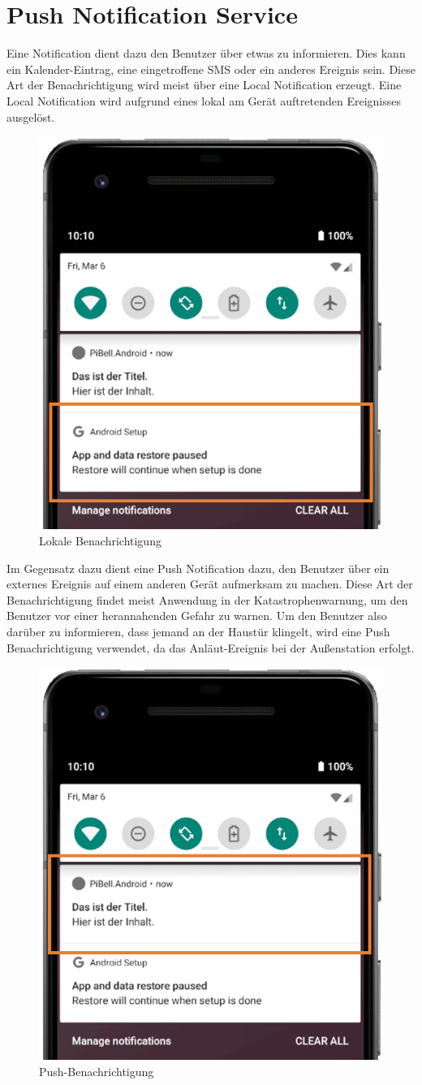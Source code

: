 \section{Push Notification Service}
Eine Notification dient dazu den Benutzer über etwas zu informieren. Dies kann ein Kalender-Eintrag, eine eingetroffene SMS oder ein anderes Ereignis sein. Diese Art der Benachrichtigung wird meist über eine Local Notification erzeugt. Eine Local Notification wird aufgrund eines lokal am Gerät auftretenden Ereignisses ausgelöst.
\begin{figure}[H]
    \centering\includegraphics[width=.5\linewidth]{images/xamarin/LocalNotification.png}
    \caption{Lokale Benachrichtigung}
\end{figure}

Im Gegensatz dazu dient eine Push Notification dazu, den Benutzer über ein externes Ereignis auf einem anderen Gerät aufmerksam zu machen. Diese Art der Benachrichtigung findet meist Anwendung in der Katastrophenwarnung, um den Benutzer vor einer herannahenden Gefahr zu warnen.
Um den Benutzer also darüber zu informieren, dass jemand an der Haustür klingelt, wird eine Push Benachrichtigung verwendet, da das Anläut-Ereignis bei der Außenstation erfolgt.
\begin{figure}[H]
    \centering\includegraphics[width=.5\linewidth]{images/xamarin/PushNotification.png}
    \caption{Push-Benachrichtigung}
\end{figure}

